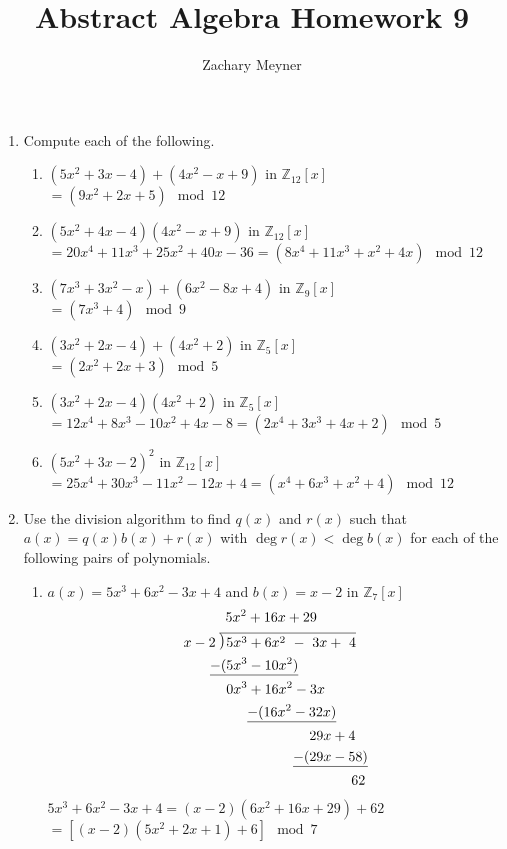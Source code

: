 \documentclass[12pt]{article}
\title{\large Abstract Algebra Homework 9}
\author{\large Zachary Meyner}
\date{}
\newcommand\setitemnumber[1]{\setcounter{enumi}{\numexpr#1-- -1\relax}}
\newcommand\Mydiv[2]{%
$\strut#1$\kern.25em\smash{\raise.3ex\hbox{$\big)$}}$\mkern-8mu
        \overline{\enspace\strut#2}$}
\begin{document}
\maketitle
\begin{enumerate}[label=\textbf{\arabic*}.]
    \setitemnumber{2}
    \item Compute each of the following.
    \begin{enumerate}
        \item $(5x^2+3x-4)+(4x^2-x+9)$ in $\mathbb{Z}_{12}[x]$ \\
        $=(9x^2+2x+5) \mod{12}$
        \item $(5x^2+4x-4)(4x^2-x+9)$ in $\mathbb{Z}_{12}[x]$ \\
        $=20x^4+11x^3+25x^2+40x-36 = (8x^4+11x^3+x^2+4x) \mod{12}$
        \item $(7x^3+3x^2-x) + (6x^2-8x+4)$ in $\mathbb{Z}_{9}[x]$ \\
        $=(7x^3+4) \mod{9}$
        \item $(3x^2+2x-4) + (4x^2+2)$ in $\mathbb{Z}_{5}[x]$ \\
        $=(2x^2+2x+3) \mod{5}$
        \item $(3x^2+2x-4)(4x^2+2)$ in $\mathbb{Z}_{5}[x]$ \\
        $=12x^4+8x^3-10x^2+4x-8 = (2x^4+3x^3+4x+2) \mod{5}$
        \item ${(5x^2+3x-2)}^2$ in $\mathbb{Z}_{12}[x]$ \\
        $=25x^4+30x^3-11x^2-12x+4 = (x^4+6x^3+x^2+4) \mod{12}$
    \end{enumerate}

    \setitemnumber{3}
    \item Use the division algorithm to find $q(x)$ and $r(x)$ such that $a(x) = q(x)b(x) + r(x)$ with 
    $\deg r(x) < \deg b(x)$ for each of the following pairs of polynomials.
    \begin{enumerate}
        \item $a(x) = 5x^3+6x^2-3x+4$ and $b(x) = x-2$ in $\mathbb{Z}_{7}[x]$
        \begin{align*}
            & \qquad \quad 5x^2+16x+29 \\
            &\text{\Mydiv{x-2}{5x^3+6x^2\ -\ 3x+ \ 4}} \\
            &\quad \ \ \: \underline{-(5x^3-10x^2)} \\
            &\qquad \quad \: \! 0x^3+16x^2 -3x \\
            &\qquad \qquad \; \; \underline{-(16x^2-32x)} \\
            &\qquad \qquad \qquad \qquad \quad 29x+4 \\
            &\qquad \qquad \qquad \qquad \, \! \! \underline{-(29x-58)} \\
            &\qquad \qquad \qquad \qquad \qquad \qquad 62
        \end{align*}
        $5x^3+6x^2-3x+4 = (x-2)(6x^2+16x+29) + 62$ \\
        $=[(x-2)(5x^2+2x+1) + 6] \mod{7}$
        

\end{enumerate}
\end{enumerate}
\end{document}
